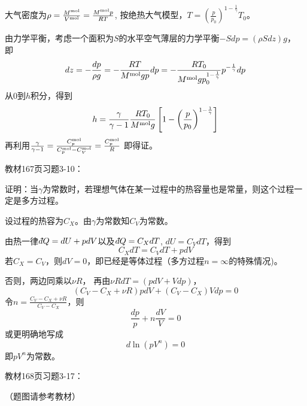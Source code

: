 \documentclass[CJK]{beamer}
\begin{document}
\begin{frame}
  \bch
  {\small
    大气密度为$ \rho = \frac{M^{\rm mol}}{V^{\rm mol}} = \frac{M^{\rm mol}p}{RT} $,   按绝热大气模型，$T = \left(\frac{p}{p_0}\right)^{1-\frac{1}{\gamma}} T_0$。
    
  由力学平衡，考虑一个面积为$S$的水平空气薄层的力学平衡$-S dp = (\rho S dz)g $， 即
  $$ dz =-\frac{dp}{\rho g} = -\frac{RT }{M^{\rm mol}gp}dp= -\frac{RT_0}{M^{\rm mol}gp_0^{1-\frac{1}{\gamma}}} p^{-\frac{1}{\gamma}} dp$$
  从$0$到$h$积分，得到
  $$ h = \frac{\gamma}{\gamma-1}\frac{RT_0}{M^{\rm mol}g}\left[1-\left(\frac{p}{p_0}\right)^{1-\frac{1}{\gamma}}\right]$$
  再利用$\frac{\gamma}{\gamma-1} = \frac{C_p^{\rm mol}}{C_p^{\rm mol}-C_V^{\rm mol}} = \frac{C_p^{\rm mol}}{R}$
    即得证。
  }
  \ech
\end{frame}

\begin{frame}
  \chtitle{\proid (\stwo)}
  \bch
  教材167页习题3-10：

  证明：当$\gamma$为常数时，若理想气体在某一过程中的热容量也是常量，则这个过程一定是多方过程。
  \ech
\end{frame}


\begin{frame}
  \bch
  {\small
  设过程的热容为$C_X$。由$\gamma$为常数知$C_V$为常数。

  由热一律$\dbar Q = dU + pdV$以及$\dbar Q = C_X dT$, $dU = C_V dT$，得到
  $$ C_X dT = C_V dT + p dV$$
  若$C_X = C_V$，则$dV = 0$，即已经是等体过程（多方过程$n=\infty$的特殊情况)。
    
    否则，两边同乘以$\nu R$， 再由$\nu R dT =  (pdV + Vdp) $，
  $$ (C_V-C_X + \nu R) pdV + (C_V-C_X) Vdp = 0$$
  令$n =\frac{C_V-C_X + \nu R}{C_V-C_X }$，则
  $$ \frac{dp}{p} + n\frac{dV}{V} = 0$$
  或更明确地写成
  $$ d \ln (pV^n) = 0$$
  即$pV^n$为常数。
  }
  \ech
\end{frame}

\begin{frame}
  \chtitle{\proid (\stwo)}
  \bch
  教材168页习题3-17：

  （题图请参考教材）
  \ech
\end{frame}
\end{document}
